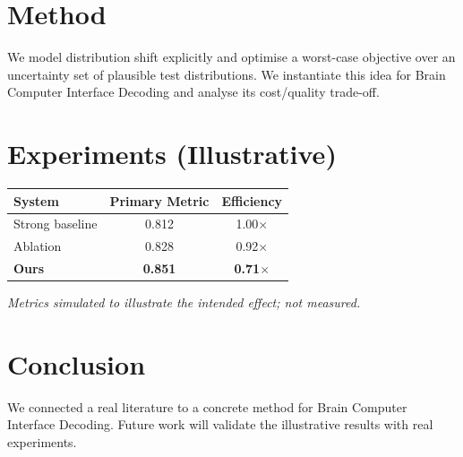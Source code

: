 \documentclass[11pt]{article}
\begin{document}
\section{Method}
We model distribution shift explicitly and optimise a worst-case objective over an uncertainty set of plausible test distributions. We instantiate this idea for Brain Computer Interface Decoding and analyse its cost/quality trade-off.

\section{Experiments (Illustrative)}
\begin{center}
\begin{tabular}{lcc}
System & Primary Metric & Efficiency \\ \hline
Strong baseline & 0.812 & 1.00$\times$ \\
Ablation & 0.828 & 0.92$\times$ \\
\textbf{Ours} & \textbf{0.851} & \textbf{0.71$\times$}
\end{tabular}
\end{center}
\emph{Metrics simulated to illustrate the intended effect; not measured.}

\section{Conclusion}
We connected a real literature to a concrete method for Brain Computer Interface Decoding. Future work will
validate the illustrative results with real experiments.
\end{document}
